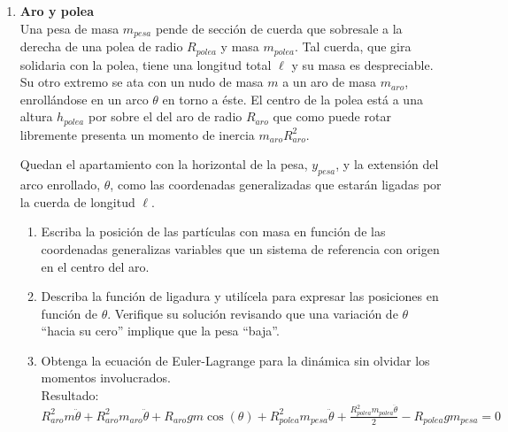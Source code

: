 \documentclass[11pt, spanish, a4paper, twoside]{article}
\begin{document}
\begin{enumerate}
	\item 
	\begin{minipage}[t][6cm]{0.57\textwidth}
		\textbf{Aro y polea}\\
		Una pesa de masa \(m_{pesa}\) pende de sección de cuerda que sobresale a la derecha de una polea de radio \(R_{polea}\) y masa \(m_{polea}\).
		Tal cuerda, que gira solidaria con la polea, tiene una longitud total \(\ell\) y su masa es despreciable.
		Su otro extremo se ata con un nudo de masa \(m\) a un aro de masa \(m_{aro}\), enrollándose en un arco \(\theta\) en torno a éste.
		El centro de la polea está a una altura \(h_{polea}\) por sobre el del aro de radio \(R_{aro}\) que como puede rotar libremente presenta un momento de inercia \(m_{aro} R_{aro}^2\).

		Quedan el apartamiento con la horizontal de la pesa, \(y_{pesa}\), y la extensión del arco enrollado, \(\theta\), como las coordenadas generalizadas que estarán ligadas por la cuerda de longitud \(\ell\).
	\end{minipage}
	\begin{minipage}[c][1.5cm][t]{0.2\textwidth}
		
	\end{minipage}
	\begin{enumerate}
		\item Escriba la posición de las partículas con masa en función de las coordenadas generalizas variables que  un sistema de referencia con origen en el centro del aro.
		\item Describa la función de ligadura y utilícela para expresar las posiciones en función de \(\theta\).
		Verifique su solución revisando que una variación de \(\theta\) ``hacia su cero'' implique que la pesa ``baja''. 
		\item Obtenga la ecuación de Euler-Lagrange para la dinámica sin olvidar los momentos involucrados.\\
		Resultado:
		\(
		R_{aro}^{2} m \ddot{\theta} + R_{aro}^{2} m_{aro} \ddot{\theta} + R_{aro} g m \cos{\left(\theta \right)} + R_{polea}^{2} m_{pesa} \ddot{\theta} + \frac{R_{polea}^{2} m_{polea} \ddot{\theta}}{2} - R_{polea} g m_{pesa} = 0
		\)
	\end{enumerate}



\end{enumerate}
\end{document}
